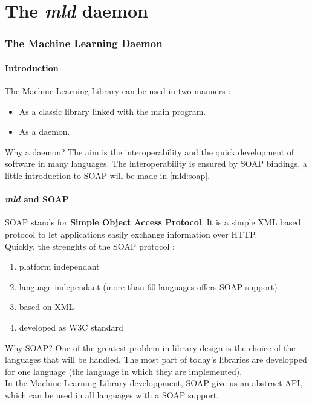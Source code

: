 \part{The \textit{mld} daemon}
\label{mld}

\section{The Machine Learning Daemon}

\subsection{Introduction}

The Machine Learning Library can be used in two manners :
\begin{itemize}
\item As a classic library linked with the main program.
\item As a daemon.
\end{itemize}

Why a daemon? The aim is the interoperability and the quick development 
of software in many languages. The interoperability is ensured by SOAP bindings, 
a little introduction to SOAP will be made in \vref{mld:soap}.\\

\subsection{\emph{mld} and SOAP}
\label{mld:soap}

SOAP stands for \textbf{Simple Object Access Protocol}. It is a simple XML 
based protocol to let applications easily exchange information 
over HTTP.\\
Quickly, the strenghts of the SOAP protocol :
\begin{enumerate}
\item platform independant
\item language independant (more than 60 languages offers SOAP support)
\item based on XML
\item developed as W3C standard
\end{enumerate}

Why SOAP? One of the greatest problem in library design is the choice of the languages that
will be handled. The most part of today's libraries are developped for one language (the language
in which they are implemented).\\
In the Machine Learning Library developpment, SOAP give us an abstract API, which can be used in
all languages with a SOAP support.\\

